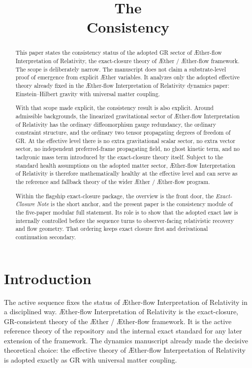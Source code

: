 \documentclass[11pt]{article}
\title{\textbf{The \TheoryName{}}\\[0.4em]
\large Consistency}
\author{}
\date{}
\newcommand{\Aether}{\AE{}ther}
\newcommand{\Aflow}{\AE{}ther-flow}
\newcommand{\TheoryName}{\Aflow{} Interpretation of Relativity}
\newcommand{\TheoryProgram}{\Aether{} / \Aflow{} framework}
\begin{document}
\AetherFlowAPATitlePage

\begin{abstract}
This paper states the consistency status of the adopted GR sector of \TheoryName{}, the exact-closure theory of \TheoryProgram{}. The scope is deliberately narrow. The manuscript does not claim a substrate-level proof of emergence from explicit \Aether{} variables. It analyzes only the adopted effective theory already fixed in the \TheoryName{} dynamics paper: Einstein--Hilbert gravity with universal matter coupling.

With that scope made explicit, the consistency result is also explicit. Around admissible backgrounds, the linearized gravitational sector of \TheoryName{} has the ordinary diffeomorphism gauge redundancy, the ordinary constraint structure, and the ordinary two tensor propagating degrees of freedom of GR. At the effective level there is no extra gravitational scalar sector, no extra vector sector, no independent preferred-frame propagating field, no ghost kinetic term, and no tachyonic mass term introduced by the exact-closure theory itself. Subject to the standard health assumptions on the adopted matter sector, \TheoryName{} is therefore mathematically healthy at the effective level and can serve as the reference and fallback theory of the wider \Aether{} / \Aflow{} program.

Within the flagship exact-closure package, the overview is the front door, the \emph{Exact-Closure Note} is the short anchor, and the present paper is the consistency module of the five-paper modular full statement. Its role is to show that the adopted exact law is internally controlled before the sequence turns to observer-facing relativistic recovery and flow geometry. That ordering keeps exact closure first and derivational continuation secondary.
\end{abstract}

\section{Introduction}

The active sequence fixes the status of \TheoryName{} in a disciplined way. \TheoryName{} is the exact-closure, GR-consistent theory of the \TheoryProgram{}. It is the active reference theory of the repository and the internal exact standard for any later extension of the framework. The dynamics manuscript already made the decisive theoretical choice: the effective theory of \TheoryName{} is adopted exactly as GR with universal matter coupling.
\end{document}
